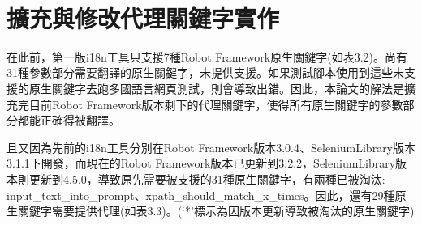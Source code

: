 \hspace*{\fill} \\
\\ \hspace*{\fill} \\
\\ \hspace*{\fill} \\
\\ \hspace*{\fill} \\
\\ \hspace*{\fill} \\
\\ \hspace*{\fill} \\
\\ \hspace*{\fill} \\
\section{擴充與修改代理關鍵字實作}
在此前，第一版i18n工具只支援7種Robot Framework原生關鍵字(如表3.2)。尚有31種參數部分需要翻譯的原生關鍵字，未提供支援。如果測試腳本使用到這些未支援的原生關鍵字去跑多國語言網頁測試，則會導致出錯。因此，本論文的解法是擴充完目前Robot Framework版本剩下的代理關鍵字，使得所有原生關鍵字的參數部分都能正確得被翻譯。

\renewcommand\arraystretch{0.8}
\begin{table}[H]
    \centering
    \caption{第一版i18n已提供代理的Robot Framework原生關鍵字}
\end{table}

且又因為先前的i18n工具分別在Robot Framework版本3.0.4、SeleniumLibrary版本3.1.1下開發，而現在的Robot Framework版本已更新到3.2.2，SeleniumLibrary版本則更新到4.5.0，導致原先需要被支援的31種原生關鍵字，有兩種已被淘汰:
input\_text\_into\_prompt、xpath\_should\_match\_x\_times。因此，還有29種原生關鍵字需要提供代理(如表3.3)。(‘*’標示為因版本更新導致被淘汰的原生關鍵字)

